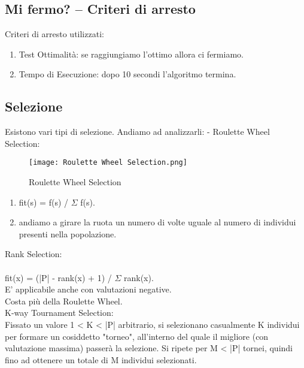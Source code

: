 \documentclass[10pt,a4paper]{article}
\begin{document}
    \subsection{Mi fermo? -- Criteri di arresto}
    \label{MiFermo?--CriteriDiArrestoSubsection}
    Criteri di arresto utilizzati:
    \begin{enumerate}
      \item Test Ottimalità: se raggiungiamo l’ottimo allora ci fermiamo.
      \item Tempo di Esecuzione: dopo 10 secondi l’algoritmo termina.
    \end{enumerate}
    
    \subsection{Selezione}
    \label{Selezione}
    Esistono vari tipi di selezione. Andiamo ad analizzarli:
    - Roulette Wheel Selection:
    \begin{figure}[h!]
      \centering
      \caption{Roulette Wheel Selection}
      \texttt{[image: Roulette Wheel Selection.png]}
      \label{RouletteWheelSelection}
    \end{figure}
    \begin{enumerate}
      \item fit(s) = f(s) / $\Sigma$ f(s).
      \item andiamo a girare la ruota un numero di volte uguale al numero di individui presenti nella 
            popolazione.
    \end{enumerate} 
    
    Rank Selection:\\\\
    fit(x) = (|P| - rank(x) + 1) / $\Sigma$ rank(x).\\
    E’ applicabile anche con valutazioni negative.\\
    Costa più della Roulette Wheel.\\
    
    K-way Tournament Selection:\\
    Fissato un valore 1 < K < |P| arbitrario, si selezionano casualmente K individui per formare un 
    cosiddetto "torneo", all’interno del quale il migliore (con valutazione massima) passerà la 
    selezione. Si ripete per M < |P| tornei, quindi fino ad ottenere un totale di M individui 
    selezionati.\\\\
    
\end{document}
